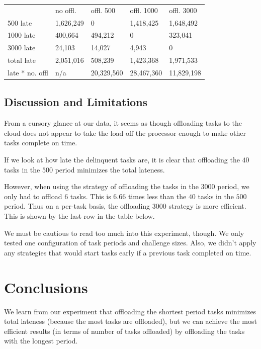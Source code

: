 \documentclass[twoside,twocolumn]{article}
\begin{document}
\begin{center}
\begin{tabular}{ l l l l l }
          & no offl. & offl. 500 & offl. 1000 & offl. 3000 \\
500 late  & 1,626,249  & 0         & 1,418,425    & 1,648,492    \\
1000 late & 400,664   & 494,212    & 0          & 323,041     \\
3000 late & 24,103    & 14,027     & 4,943       & 0          \\
total late& 2,051,016  & 508,239    & 1,423,368    & 1,971,533 \\
late * no. offl& n/a & 20,329,560 & 28,467,360 & 11,829,198
\end{tabular}
\end{center}


\subsection{Discussion and Limitations}

From a cursory glance at our data, it seems as though offloading tasks to the cloud does not appear to take the load off the processor enough to make other tasks complete on time.

If we look at how late the delinquent tasks are, it is clear that offloading the $40$ tasks in the $500$ period minimizes the total lateness.

However, when using the strategy of offloading the tasks in the $3000$ period, we only had to offload $6$ tasks.
This is $6.66$ times less than the $40$ tasks in the $500$ period.
Thus on a per-task basis, the offloading $3000$ strategy is more efficient.
This is shown by the last row in the table below.

We must be cautious to read too much into this experiment, though.
We only tested one configuration of task periods and challenge sizes.
Also, we didn't apply any strategies that would start tasks early if a previous task completed on time.

\section{Conclusions}

We learn from our experiment that offloading the shortest period tasks minimizes total lateness (because the most tasks are offloaded), but we can achieve the most efficient results (in terms of number of tasks offloaded) by offloading the tasks with the longest period.
\end{document}
